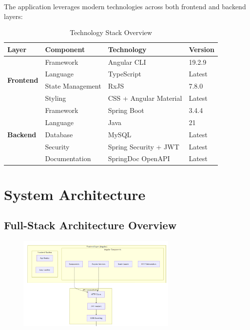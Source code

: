 \documentclass[12pt,a4paper]{article}
\begin{document}
The application leverages modern technologies across both frontend and backend layers:

\begin{table}[h!]
    \centering
    \begin{tabular}{@{}llll@{}}
        \toprule
        \textbf{Layer}                     & \textbf{Component} & \textbf{Technology}    & \textbf{Version} \\
        \midrule
        \multirow{4}{*}{\textbf{Frontend}} & Framework          & Angular CLI            & 19.2.9           \\
                                           & Language           & TypeScript             & Latest           \\
                                           & State Management   & RxJS                   & 7.8.0            \\
                                           & Styling            & CSS + Angular Material & Latest           \\
        \midrule
        \multirow{5}{*}{\textbf{Backend}}  & Framework          & Spring Boot            & 3.4.4            \\
                                           & Language           & Java                   & 21               \\
                                           & Database           & MySQL                  & Latest           \\
                                           & Security           & Spring Security + JWT  & Latest           \\
                                           & Documentation      & SpringDoc OpenAPI      & Latest           \\
        \bottomrule
    \end{tabular}
    \caption{Technology Stack Overview}
\end{table}

\section{System Architecture}

\subsection{Full-Stack Architecture Overview}

\begin{figure}[H]
    \centering
    \includegraphics[width=0.7\textwidth]{arch1.png}
\end{figure}
\end{document}
